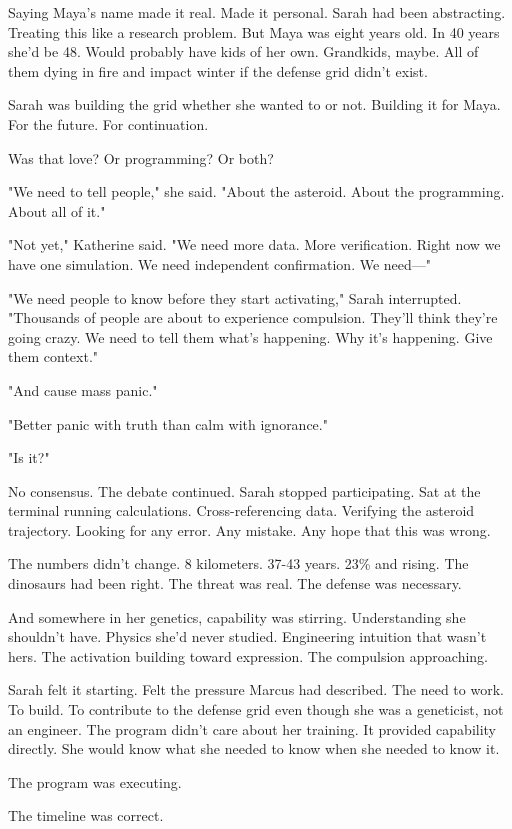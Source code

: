 Saying Maya's name made it real. Made it personal. Sarah had been abstracting. Treating this like a research problem. But Maya was eight years old. In 40 years she'd be 48. Would probably have kids of her own. Grandkids, maybe. All of them dying in fire and impact winter if the defense grid didn't exist.

Sarah was building the grid whether she wanted to or not. Building it for Maya. For the future. For continuation.

Was that love? Or programming? Or both?

"We need to tell people," she said. "About the asteroid. About the programming. About all of it."

"Not yet," Katherine said. "We need more data. More verification. Right now we have one simulation. We need independent confirmation. We need—"

"We need people to know before they start activating," Sarah interrupted. "Thousands of people are about to experience compulsion. They'll think they're going crazy. We need to tell them what's happening. Why it's happening. Give them context."

"And cause mass panic."

"Better panic with truth than calm with ignorance."

"Is it?"

No consensus. The debate continued. Sarah stopped participating. Sat at the terminal running calculations. Cross-referencing data. Verifying the asteroid trajectory. Looking for any error. Any mistake. Any hope that this was wrong.

The numbers didn't change. 8 kilometers. 37-43 years. 23\% and rising. The dinosaurs had been right. The threat was real. The defense was necessary.

And somewhere in her genetics, capability was stirring. Understanding she shouldn't have. Physics she'd never studied. Engineering intuition that wasn't hers. The activation building toward expression. The compulsion approaching.

Sarah felt it starting. Felt the pressure Marcus had described. The need to work. To build. To contribute to the defense grid even though she was a geneticist, not an engineer. The program didn't care about her training. It provided capability directly. She would know what she needed to know when she needed to know it.

The program was executing.

The timeline was correct.

